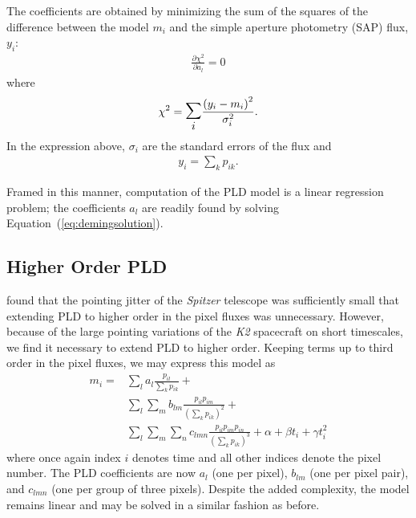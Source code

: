 \documentclass[]{emulateapj}
\begin{document}
The coefficients are obtained by minimizing the sum of the squares of the difference
between the model $m_i$ and the simple aperture photometry (SAP) flux, $y_i$:
\begin{align}
\label{eq:demingsolution}
\frac{\partial \chi^2}{\partial a_l} = 0
\end{align}
where
\begin{align}
\label{eq:demingchisq}
\chi^2 = \mathlarger{\mathlarger{\sum\limits_{i}}}\frac{\left(y_i - m_i\right)^2}{\sigma_i^2}.
\end{align}
In the expression above, $\sigma_i$ are the standard errors of the flux and
\begin{align}
\label{eq:demingsap}
y_i = \sum\limits_{k}p_{ik}.
\end{align}

Framed in this manner, computation of the PLD model is a linear regression problem; the
coefficients $a_l$ are readily found by solving Equation~(\ref{eq:demingsolution}).
%

\subsection{Higher Order PLD}
\label{sec:higherorder}
\cite{DEM15} found that the pointing jitter of the \emph{Spitzer} telescope was 
sufficiently small that extending PLD to higher order in the pixel fluxes was
unnecessary. However, because of the large pointing variations of the \emph{K2}
spacecraft on short timescales, we find it necessary to extend PLD to higher order.
Keeping terms up to third order in the pixel fluxes, we may express this model as 
\begin{align}
\label{eq:pldmodel}
m_i = &\sum\limits_{l}a_l\frac{p_{il}}{\sum\limits_{k}p_{ik}} + \nonumber\\
      &\sum\limits_{l}\sum\limits_{m}b_{lm}\frac{p_{il}p_{im}}{(\sum\limits_{k}p_{ik})^2} + \nonumber\\
      &\sum\limits_{l}\sum\limits_{m}\sum\limits_{n}c_{lmn}\frac{p_{il}p_{im}p_{in}}{(\sum\limits_{k}p_{ik})^3} + \alpha + \beta t_i + \gamma t_i^2
\end{align}
where once again index $i$ denotes time and all other indices denote the pixel number. 
The PLD coefficients are now $a_l$ (one per pixel), 
$b_{lm}$ (one per pixel pair), and $c_{lmn}$ (one per group of three pixels). Despite
the added complexity, the model remains linear and may be solved in a similar fashion 
as before.
\end{document}
